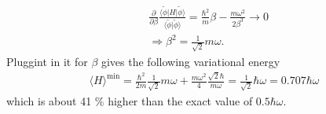 \documentclass{jlreq}
\begin{document}
\begin{align}
    &\frac{\partial}{\partial\beta}\frac{\langle\tilde{\phi}|H|\tilde{\phi}\rangle}{\langle\tilde{\phi}|\tilde{\phi}\rangle}=\frac{\hbar^2}{m}\beta-\frac{m\omega^2}{2\beta^3}\rightarrow 0 \\
    &\Rightarrow \beta^2=\frac{1}{\sqrt{2}}m\omega.
\end{align}
Pluggint in it for $\beta$ gives the following variational energy
\begin{align}
    \langle H\rangle^\text{min}=\frac{\hbar^2}{2m}\frac{1}{\sqrt{2}}m\omega+\frac{m\omega^2}{4} \frac{\sqrt{2}\hbar}{m\omega}=\frac{1}{\sqrt{2}}\hbar\omega=0.707\hbar\omega
\end{align}
which is about 41 \% higher than the exact value of $0.5\hbar\omega$.
\end{document}
